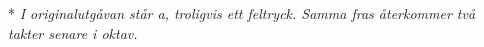 \vspace{5mm}
* \textit{I originalutgåvan står a, troligvis ett feltryck. Samma fras återkommer två takter senare i oktav.}
